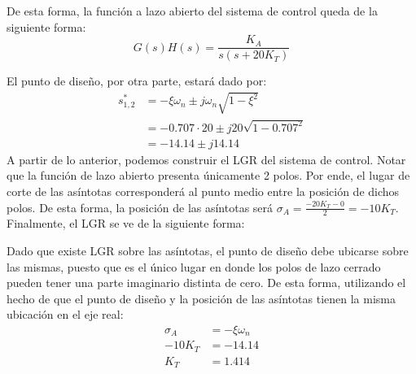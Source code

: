 \documentclass[
  11pt,
  letterpaper,
   addpoints,
   answers
  ]{exam}
\begin{document}
\begin{questions}
\begin{solution}
De esta forma, la función a lazo abierto del sistema de control queda de la siguiente forma:
\begin{equation}
    G(s)H(s)=\frac{K_A}{s(s+20K_T)} \nonumber
\end{equation}

El punto de diseño, por otra parte, estará dado por:
\begin{align}
    s_{1,2}^* &=-\xi\omega_n \pm j\omega_n\sqrt{1-\xi^2} \nonumber \\
    &=-0.707\cdot20\pm j20\sqrt{1-0.707^2} \nonumber \\
    &=-14.14\pm j 14.14
\end{align}
A partir de lo anterior, podemos construir el LGR del sistema de control. Notar que la función de lazo abierto presenta únicamente 2 polos. Por ende, el lugar de corte de las asíntotas corresponderá al punto medio entre la posición de dichos polos. De esta forma, la posición de las asíntotas será  $\sigma_A=\frac{-20K_T-0}{2}=-10K_T$. Finalmente, el LGR se ve de la siguiente forma:


Dado que existe LGR sobre las asíntotas, el punto de diseño debe ubicarse sobre las mismas, puesto que es el único lugar en donde los polos de lazo cerrado pueden tener una parte imaginario distinta de cero. De esta forma, utilizando el hecho de que el punto de diseño y la posición de las asíntotas tienen la misma ubicación en el eje real:
\begin{align}
    \sigma_A&=-\xi\omega_n \nonumber\\
    -10K_T&=-14.14\\
    K_T&=1.414 
\end{align}


\end{solution}
\end{questions}
\end{document}
